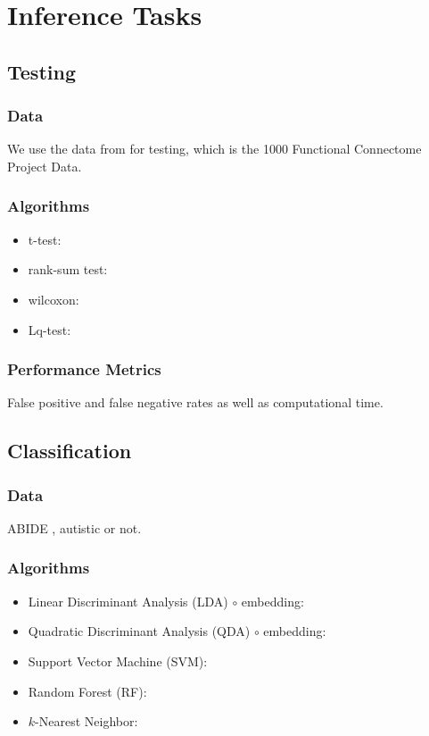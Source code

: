 \documentclass[12pt]{article}
\begin{document}
\section{Inference Tasks}
\subsection{Testing}


\subsubsection{Data}

We use the data from \cite{Elkund2013} for testing, which is the 1000 Functional Connectome Project Data.

\subsubsection{Algorithms}

\begin{itemize} \itemsep0pt
	\item t-test:
	\item rank-sum test:
	\item wilcoxon:
	\item Lq-test: 
\end{itemize}


\subsubsection{Performance Metrics}


False positive and false negative rates as well as computational time.


\subsection{Classification}

\subsubsection{Data}

ABIDE \cite{abide}, autistic or not.

\subsubsection{Algorithms}

\begin{itemize} \itemsep0pt
	\item Linear Discriminant Analysis (LDA) $\circ$ embedding:
	\item Quadratic Discriminant Analysis (QDA) $\circ$ embedding:
	\item Support Vector Machine (SVM):
	\item Random Forest (RF):
	\item $k$-Nearest Neighbor: 
\end{itemize}
\end{document}
